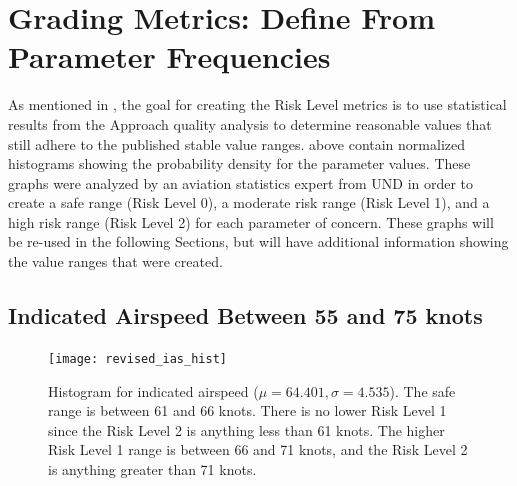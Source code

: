         
        


\section{Grading Metrics:  Define From Parameter Frequencies}

	As mentioned in , the goal for creating the Risk Level metrics is to use statistical results from the Approach quality analysis to determine reasonable values that still adhere to the published stable value ranges.   above contain normalized histograms showing the probability density for the parameter values.  These graphs were analyzed by an aviation statistics expert from UND in order to create a safe range (Risk Level 0), a moderate risk range (Risk Level 1), and a high risk range (Risk Level 2) for each parameter of concern.  These graphs will be re-used in the following Sections, but will have additional information showing the value ranges that were created.


    
    	
    \subsection{Indicated Airspeed Between 55 and 75 knots}

		\begin{figure}
			\centering
            \texttt{[image: revised\_ias\_hist]}
            \caption{Histogram for indicated airspeed ($\mu = 64.401, \sigma = 4.535$).  The safe range is between 61 and 66 knots.  There is no lower Risk Level 1 since the Risk Level 2 is anything less than 61 knots.  The higher Risk Level 1 range is between 66 and 71 knots, and the Risk Level 2 is anything greater than 71 knots.}
            \label{fig:revised_ias_hist}
		\end{figure}



